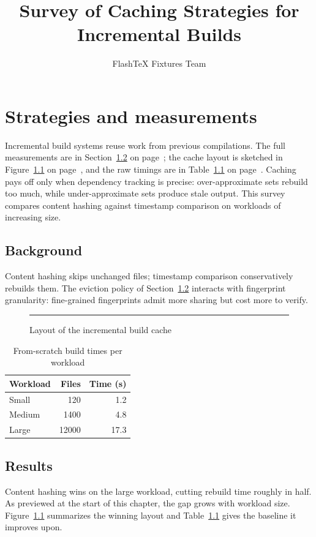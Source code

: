 \documentclass[11pt,notitlepage]{report}
\title{Survey of Caching Strategies for Incremental Builds}
\author{FlashTeX Fixtures Team}
\date{}
\begin{document}
\maketitle
\begingroup
\let\clearpage\relax
\tableofcontents
\listoffigures
\listoftables
\endgroup
\chapter{Strategies and measurements}
\label{ch:strat}
Incremental build systems reuse work from previous compilations. The full measurements are in Section~\ref{sec:results} on page~\pageref{sec:results}; the cache layout is sketched in Figure~\ref{fig:cache} on page~\pageref{fig:cache}, and the raw timings are in Table~\ref{tab:times} on page~\pageref{tab:times}. Caching pays off only when dependency tracking is precise: over-approximate sets rebuild too much, while under-approximate sets produce stale output. This survey compares content hashing against timestamp comparison on workloads of increasing size.
\section{Background}
Content hashing skips unchanged files; timestamp comparison conservatively rebuilds them. The eviction policy of Section~\ref{sec:results} interacts with fingerprint granularity: fine-grained fingerprints admit more sharing but cost more to verify.
\begin{figure}[ht]
\centering
\rule{0.6\textwidth}{3cm}
\caption{Layout of the incremental build cache}
\label{fig:cache}
\end{figure}
\begin{table}[ht]
\centering
\begin{tabular}{|l|r|r|}
\hline
Workload & Files & Time (s) \\
\hline
Small & 120 & 1.2 \\
Medium & 1400 & 4.8 \\
Large & 12000 & 17.3 \\
\hline
\end{tabular}
\caption{From-scratch build times per workload}
\label{tab:times}
\end{table}
\section{Results}
\label{sec:results}
Content hashing wins on the large workload, cutting rebuild time roughly in half. As previewed at the start of this chapter, the gap grows with workload size. Figure~\ref{fig:cache} summarizes the winning layout and Table~\ref{tab:times} gives the baseline it improves upon.
\end{document}

